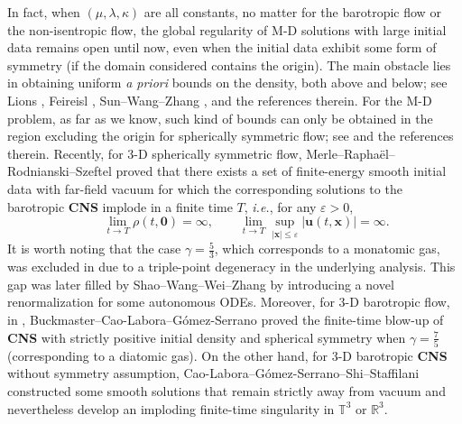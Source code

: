 \documentclass[11pt,reqno]{amsart}
\numberwithin{rk}{section}
\numberwithin{prop}{section}
\numberwithin{mydef}{section}
\numberwithin{lem}{section}
\numberwithin{equation}{section}
\numberwithin{thm}{section}
\begin{document}
In fact, when $(\mu, \lambda,\kappa)$  are all constants, no matter for the barotropic flow or the non-isentropic flow, 
the global regularity of M-D solutions with large initial data remains open until now, even when the initial data exhibit some form of symmetry (if the domain considered contains the origin). 
The main obstacle lies in obtaining uniform {\it a priori} bounds on the density, both above and below; see Lions \cite{lions},  Feireisl \cite{fu3}, Sun--Wang--Zhang \cite{zhangzhifei},  and the references therein. 
For the M-D problem, as far as we know,  such kind of bounds can only be obtained in the region excluding the origin for spherically symmetric flow; see \cite{ck,H,HJ,J} and the references therein.
Recently, for 3-D spherically symmetric flow, Merle--Rapha\"el--Rodnianski--Szeftel \cite{MPI}  proved that there exists a set of finite-energy smooth initial data with far-field vacuum for which the corresponding solutions to the barotropic   \textbf{CNS} implode  in a finite time $T$, \textit{i.e.},
for any $\varepsilon>0$,
\begin{equation}\label{densityimplosion}
\quad \ \ \ \ \lim_{t\to T}\rho(t,\boldsymbol{0})=\infty,
\qquad  \lim_{t\to T} \sup_{|\boldsymbol{x}|\leq \varepsilon}|\boldsymbol{u}(t,\boldsymbol{x})|=\infty.
\end{equation}  
It is worth noting that the case $\gamma = \frac{5}{3}$, which corresponds to a monatomic gas,  was excluded in \cite{MPI} 
due to a triple-point degeneracy in the underlying analysis. This gap was later filled   by Shao--Wang--Wei--Zhang \cite{shao} by introducing a novel renormalization
for some autonomous ODEs. 
Moreover, for 3-D barotropic flow,  in  \cite{buckmaster}, Buckmaster--Cao-Labora--Gómez-Serrano  proved the finite-time blow-up of \textbf{CNS} with strictly positive initial density and spherical symmetry when $\gamma=\frac{7}{5}$ (corresponding to a diatomic gas).
On the other hand,  for 3-D barotropic \textbf{CNS} without symmetry assumption, 
 Cao-Labora--Gómez-Serrano--Shi--Staffilani \cite{shijia}  constructed some smooth solutions 
 that remain strictly away from vacuum and nevertheless develop an imploding finite-time 
 singularity in $\mathbb{T}^3$ or $\mathbb{R}^3$. 

 
\end{document}
